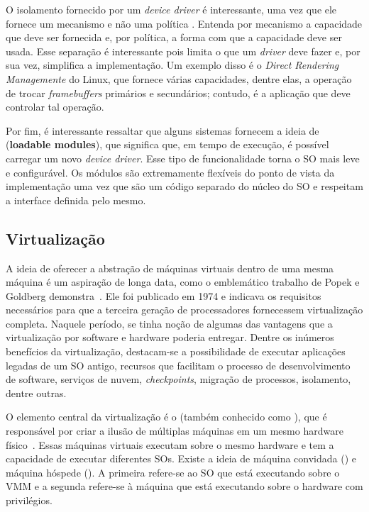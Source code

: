O isolamento fornecido por um \emph{device driver} é interessante, uma vez que
ele fornece um mecanismo e não uma política \citep{ddbook}. Entenda por
mecanismo a capacidade que deve ser fornecida e, por política, a forma com
que a capacidade deve ser usada. Esse separação é interessante pois limita o
que um \emph{driver} deve fazer e, por sua vez, simplifica a implementação. Um
exemplo disso é o \emph{Direct Rendering Managemente} do Linux, que
fornece várias capacidades, dentre elas, a operação de trocar
\emph{framebuffers} primários e secundários; contudo, é a aplicação que deve
controlar tal operação.

Por fim, é interessante ressaltar que alguns sistemas fornecem a ideia de
 (\textbf{loadable modules}), que significa
que, em tempo de execução, é possível carregar um novo \emph{device driver}. Esse
tipo de funcionalidade torna o SO mais leve e configurável. Os módulos
são extremamente flexíveis do ponto de vista da implementação uma vez que são
um código separado do núcleo do SO e respeitam a interface definida pelo mesmo.

\subsection{Virtualização}
\label{sec:virtualizacao}


A ideia de oferecer a abstração de máquinas virtuais dentro de uma mesma
máquina é um aspiração de longa data, como o emblemático trabalho de Popek e
Goldberg demonstra~\citep{popek}. Ele foi publicado em 1974 e indicava os
requisitos necessários para que a terceira geração de processadores fornecessem
virtualização completa. Naquele período, se tinha noção de algumas das vantagens
que a virtualização por software e hardware poderia entregar. Dentre os
inúmeros benefícios da virtualização, destacam-se a possibilidade de executar
aplicações legadas de um SO antigo, recursos que facilitam o processo de
desenvolvimento de software, serviços de nuvem, \emph{checkpoints}, migração de
processos, isolamento, dentre outras.

O elemento central da virtualização é o  (também
conhecido como ), que é responsável por
criar a ilusão de múltiplas máquinas em um mesmo hardware
físico~\citep{tanenbaum}. Essas máquinas virtuais executam sobre o mesmo hardware
e tem a capacidade de executar diferentes SOs. Existe a ideia de máquina
convidada () e máquina hóspede (). A
primeira refere-se ao SO que está executando sobre o VMM e a segunda refere-se
à máquina que está executando sobre o hardware com privilégios.

